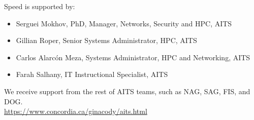 
Speed is supported by:
\begin{itemize}
	\item 
	Serguei Mokhov, PhD, Manager, Networks, Security and HPC, AITS
	\item 
	Gillian Roper, Senior Systems Administrator, HPC, AITS
	\item 
	Carlos Alarcón Meza, Systems Administrator, HPC and Networking, AITS
	\item 
	Farah Salhany, IT Instructional Specialist, AITS
\end{itemize}

\noindent We receive support from the rest of AITS teams, such as NAG, SAG, FIS, and DOG.\\
\url{https://www.concordia.ca/ginacody/aits.html}